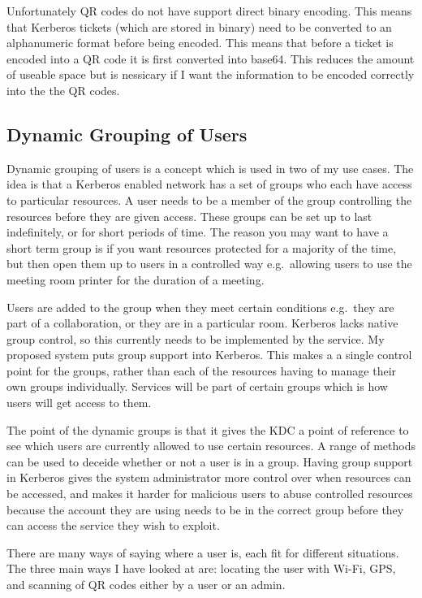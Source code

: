 \documentclass[]{report}   %
\begin{document}
Unfortunately QR codes do not have support direct binary encoding. This means that Kerberos tickets (which are stored in binary) need to be converted to an alphanumeric format before being encoded. This means that before a ticket is encoded into a QR code it is first converted into base64. This reduces the amount of useable space but is nessicary if I want the information to be encoded correctly into the the QR codes.

\subsection{Dynamic Grouping of Users}
Dynamic grouping of users is a concept which is used in two of my use cases. The idea is that a Kerberos enabled network has a set of groups who each have access to particular resources. A user needs to be a member of the group controlling the resources before they are given access. These groups can be set up to last indefinitely, or for short periods of time. The reason you may want to have a short term group is if you want resources protected for a majority of the time, but then open them up to users in a controlled way e.g.\ allowing users to use the meeting room printer for the duration of a meeting.

Users are added to the group when they meet certain conditions e.g.\ they are part of a collaboration, or they are in a particular room. Kerberos lacks native group control, so this currently needs to be implemented by the service. My proposed system puts group support into Kerberos. This makes a a single control point for the groups, rather than each of the resources having to manage their own groups individually. Services will be part of certain groups which is how users will get access to them.

The point of the dynamic groups is that it gives the KDC a point of reference to see which users are currently allowed to use certain resources. A range of methods can be used to deceide whether or not a user is in a group. Having group support in Kerberos gives the system administrator more control over when resources can be accessed, and makes it harder for malicious users to abuse controlled resources because the account they are using needs to be in the correct group before they can access the service they wish to exploit.

There are many ways of saying where a user is, each fit for different situations. The three main ways I have looked at are: locating the user with Wi-Fi, GPS, and scanning of QR codes either by a user or an admin.
\end{document}
